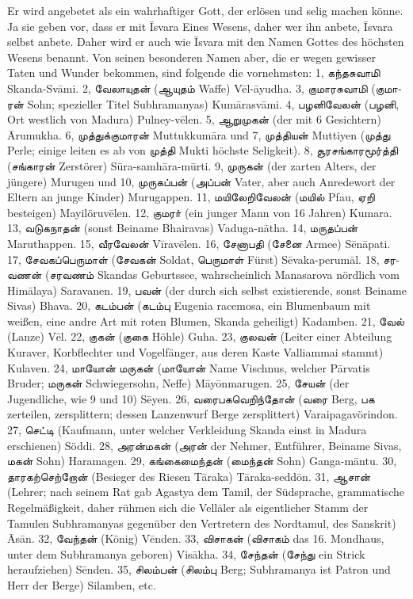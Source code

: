 \documentclass{article}
\newcommand{\TamilText}[1]{\texttamil{#1}}
\newcommand{\tam}[1]{\TamilText{#1}}
\begin{document}
Er wird angebetet als ein wahrhaftiger Gott, der erlösen und selig machen könne. Ja sie geben vor, dass er mit \={I}svara Eines Wesens, daher wer ihn anbete, \={I}svara selbst anbete. Daher wird er auch wie \={I}svara mit den Namen Gottes des höchsten Wesens benannt. Von seinen besonderen Namen aber, die er wegen gewisser Taten und Wunder bekommen, sind folgende die vornehmsten: 1, \tam{கந்தசுவாமி} Skanda-Sv\={a}mi. 2, \tam{வேலாயுதன்} (\tam{ஆயுதம்} Waffe) V\={e}l-\={a}yudha. 3, \tam{குமாரசுவாமி} (\tam{குமாரன்} Sohn; spezieller Titel Subhramanyas) Kum\={a}rasv\={a}mi. 4, \tam{பழனிவேலன்} (\tam{பழனி}, Ort westlich von Madura) Pulney-v\={e}len. 5, \tam{ஆறுமுகன்} (der mit 6 Gesichtern) \={A}rumukha. 6, \tam{முத்துக்குமாரன்} Muttukkum\={a}ra und 7, \tam{முத்தியன்} Muttiyen (\tam{முத்து} Perle; einige leiten es ab von \tam{முத்தி} Mukti höchste Seligkeit). 8, \tam{சூரசங்காரமூர்த்தி} (\tam{சங்காரன்} Zerstörer) S\={u}ra-samh\={a}ra-m\={u}rti. 9, \tam{முருகன்} (der zarten Alters, der jüngere) Murugen und 10, \tam{முருகப்பன்} (\tam{அப்பன்} Vater, aber auch Anredewort der Eltern an junge Kinder) Murugappen. 11, \tam{மயிலேறிவேலன்} (\tam{மயில்} Pfau, \tam{ஏறி} besteigen) Mayilöruv\={e}len. 12, \tam{குமரா்} (ein junger Mann von 16 Jahren) Kumara. 13, \tam{வடுகநாதன்} (sonst Beiname Bhairavas) Vaduga-n\={a}tha. 14, \tam{மருதப்பன்} Maruthappen. 15, \tam{வீரவேலன்} V\={i}rav\={e}len. 16, \tam{சேனாபதி} (\tam{சேனை} Armee) S\={e}n\={a}pati. 17, \tam{சேவகப்பெருமாள்} (\tam{சேவகன்} Soldat, \tam{பெருமாள்} Fürst) S\={e}vaka-perum\={a}l. 18, \tam{சரவணன்} (\tam{சரவணம்} Skandas Geburtssee, wahrscheinlich Manasarova nördlich vom Him\={a}laya) Saravanen. 19, \tam{பவன்} (der durch sich selbst existierende, sonst Beiname Sivas) Bhava. 20, \tam{கடம்பன்} (\tam{கடம்பு} Eugenia racemosa, ein Blumenbaum mit weißen, eine andre Art mit roten Blumen, Skanda geheiligt) Kadamben. 21, \tam{வேல்} (Lanze) V\={e}l. 22, \tam{குகன்} (\tam{குகை} Höhle) Guha. 23, \tam{குலவன்} (Leiter einer Abteilung Kuraver, Korbflechter und Vogelfänger, aus deren Kaste Valliammai stammt) Kulaven. 24, \tam{மாயோன்} \tam{மருகன்} (\tam{மாயோன்} Name Vischnus, welcher P\={a}rvatis Bruder; \tam{மருகன்} Schwiegersohn, Neffe) M\={a}y\={o}nmarugen. 25, \tam{சேயன்} (der Jugendliche, wie 9 und 10) S\={e}yen. 26, \tam{வரைபகவெறிந்தோன்} (\tam{வரை} Berg, \tam{பக} zerteilen, zersplittern; dessen Lanzenwurf Berge zersplittert) Varaipagavörindon. 27, \tam{செட்டி} (Kaufmann, unter welcher Verkleidung Skanda einst in Madura erschienen) Söddi. 28, \tam{அரன்மகன்} (\tam{அரன்} der Nehmer, Entführer, Beiname Sivas, \tam{மகன்} Sohn) Haramagen. 29, \tam{கங்கைமைந்தன்} (\tam{மைந்தன்} Sohn) Ganga-m\={a}ntu. 30, \tam{தாரகற்செற்றோன்} (Besieger des Riesen T\={a}raka) T\={a}raka-sedd\={o}n. 31, \tam{ஆசான்} (Lehrer; nach seinem Rat gab Agastya dem Tamil, der Südsprache, grammatische Regelmäßigkeit, daher rühmen sich die Vell\={a}ler als eigentlicher Stamm der Tamulen Subhramanyas gegenüber den Vertretern des Nordtamul, des Sanskrit) \={A}s\={a}n. 32, \tam{வேந்தன்} (König) V\={e}nden. 33, \tam{விசாகன்} (\tam{விசாகம்} das 16. Mondhaus, unter dem Subhramanya geboren) Vis\={a}kha. 34, \tam{சேந்தன்} (\tam{சேந்து} ein Strick heraufziehen) S\={e}nden. 35, \tam{சிலம்பன்} (\tam{சிலம்பு} Berg; Subhramanya ist Patron und Herr der Berge) Silamben, etc.
\end{document}
